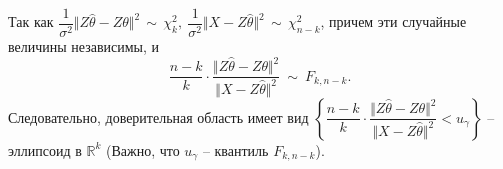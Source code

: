 Так как $\displaystyle \dfrac{1}{\sigma ^{2}}\Vert Z\hat{\theta } -Z\theta \Vert ^{2} \, \sim \, \chi _{k}^{2} ,\ \dfrac{1}{\sigma ^{2}}\Vert X-Z\hat{\theta }\Vert ^{2} \, \sim \, \chi _{n-k}^{2}$, причем эти случайные величины независимы, и
\begin{equation*}
    \dfrac{n-k}{k} \cdotp \dfrac{\Vert Z\hat{\theta } -Z\theta \Vert ^{2}}{\Vert X-Z\hat{\theta }\Vert ^{2}} \ \sim \ F_{k,n-k} .
\end{equation*}
Следовательно, доверительная область имеет вид $\displaystyle \left\{\dfrac{n-k}{k} \cdotp \dfrac{\Vert Z\hat{\theta } -Z\theta \Vert ^{2}}{\Vert X-Z\hat{\theta }\Vert ^{2}} < u_{\gamma }\right\}$ -- эллипсоид в $\displaystyle \mathbb{R}^{k}$ (Важно, что $u_{\gamma }$ -- квантиль $F_{k,n-k}$).